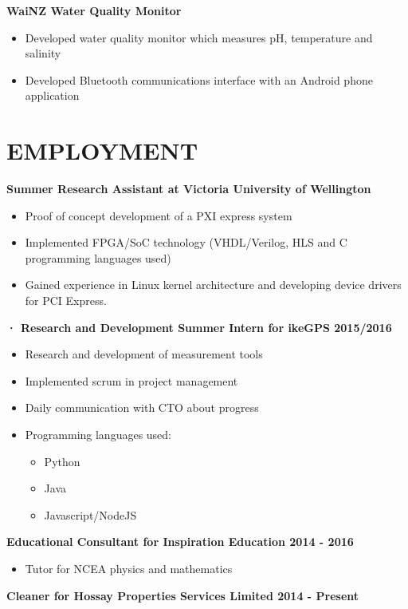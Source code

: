 \documentclass[3pt]{res}
\begin{document}
\begin{resume}
  {\bf WaiNZ Water Quality Monitor}
    \begin{itemize}[noitemsep] %
      \item Developed water quality monitor which measures pH, temperature and salinity 
      \item Developed Bluetooth communications interface with an Android phone application  
      \end{itemize}      
      
      


      
\section{EMPLOYMENT} 
\vspace{0.1in}
   {\bf Summer Research Assistant at Victoria University of Wellington} 
    \begin{itemize}[noitemsep]
      \item Proof of concept development of a PXI express system
      \item Implemented FPGA/SoC technology (VHDL/Verilog, HLS and C programming languages used)
      \item Gained experience in Linux kernel architecture and developing device drivers for PCI Express.
    \end{itemize} 
    {\bf ·	Research and Development Summer Intern for ikeGPS 2015/2016} 
    \begin{itemize}[noitemsep] %
      \item Research and development of measurement tools
      \item Implemented scrum in project management
      \item Daily communication with CTO about progress
      \item Programming languages used:
      \begin{itemize}
      \item Python
      \item Java
      \item Javascript/NodeJS
    \end{itemize}
      \end{itemize}
    {\bf Educational Consultant for Inspiration Education 2014 - 2016} 
    \begin{itemize}[noitemsep]
      \item Tutor for NCEA physics and mathematics
    \end{itemize}
     {\bf Cleaner for Hossay Properties Services Limited 2014 - Present} 
   

\end{resume}
\end{document}
